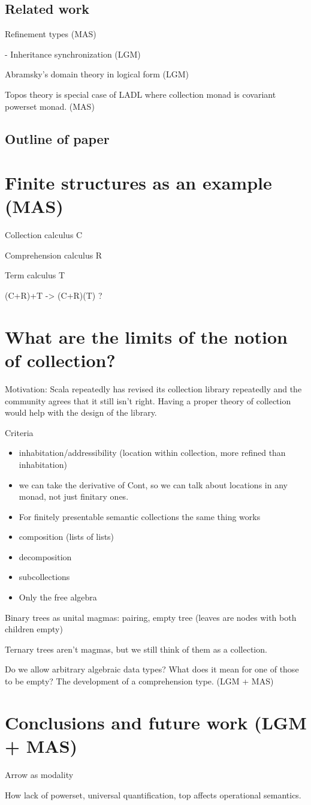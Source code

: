 \documentclass{article}
\renewcommand{\:}{\colon}
\begin{document}
\subsection{Related work}
  Refinement types (MAS)

  - Inheritance synchronization (LGM)

  Abramsky's domain theory in logical form (LGM)

  Topos theory is special case of LADL where collection monad is covariant powerset monad. (MAS)
\subsection{Outline of paper}

\section{Finite structures as an example (MAS)}
Collection calculus C

Comprehension calculus R

Term calculus T

(C+R)+T -> (C+R)(T) ?

\section{What are the limits of the notion of collection?}
Motivation: Scala repeatedly has revised its collection library repeatedly and the community agrees that it still isn't right.  Having a proper theory of collection would help with the design of the library.

Criteria
\begin{itemize}
  \item inhabitation/addressibility (location within collection, more refined than inhabitation) 
  \item we can take the derivative of Cont, so we can talk about locations in any monad, not just finitary ones.
  \item For finitely presentable semantic collections the same thing works
  \item composition (lists of lists)
  \item decomposition
  \item subcollections
  \item Only the free algebra
\end{itemize}

Binary trees as unital magmas: pairing, empty tree (leaves are nodes with both children empty)

Ternary trees aren't magmas, but we still think of them as a collection.

Do we allow arbitrary algebraic data types?  What does it mean for one of those to be empty?
The development of a comprehension type. (LGM + MAS)

\section{Conclusions and future work (LGM + MAS)}
Arrow as modality

How lack of powerset, universal quantification, top affects operational semantics.

%
%
\end{document}
